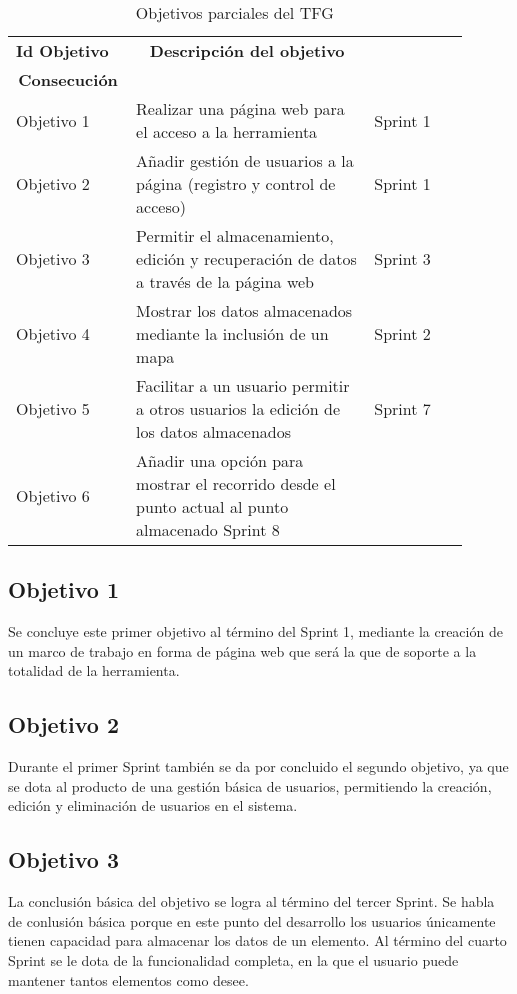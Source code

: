 \begin{table}[hp]
  \centering 
  \begin{tabular}{p{0.2\linewidth}p{0.5\linewidth}p{0.2\linewidth}}
    \multicolumn{1}{l}{\cellcolor{black!30}\textbf{Id Objetivo}} & 
 	\multicolumn{1}{c}{\cellcolor{black!30}\textbf{Descripción del objetivo}}\\
 	\multicolumn{1}{c}{\cellcolor{black!30}\textbf{Consecución}}\\
    \toprule
    Objetivo 1 & Realizar una página web para el acceso a la herramienta & Sprint 1 \\
	Objetivo 2 & Añadir gestión de usuarios a la página (registro y control de acceso) & Sprint 1 \\
	Objetivo 3 & Permitir el almacenamiento, edición y recuperación de datos a través de la página web & Sprint 3 \\
	Objetivo 4 & Mostrar los datos almacenados mediante la inclusión de un mapa & Sprint 2 \\
	Objetivo 5 & Facilitar a un usuario permitir a otros usuarios la edición de los datos almacenados & Sprint 7\\
	Objetivo 6 & Añadir una opción para mostrar el recorrido desde el punto actual al punto almacenado Sprint 8\\
    \hline
  \end{tabular}
  \caption{Objetivos parciales del \ac{TFG}}
  \label{tab:objetivos2}
\end{table}

\subsection{Objetivo 1}
Se concluye este primer objetivo al término del Sprint 1, mediante la creación de un marco de trabajo en forma de página web que será la que de soporte a la totalidad de la herramienta.

\subsection{Objetivo 2}
Durante el primer Sprint también se da por concluido el segundo objetivo, ya que se dota al producto de una gestión básica de usuarios, permitiendo la creación, edición y eliminación de usuarios en el sistema.

\subsection{Objetivo 3}
La conclusión básica del objetivo se logra al término del tercer Sprint. Se habla de conlusión básica porque en este punto del desarrollo los usuarios únicamente tienen capacidad para almacenar los datos de un elemento. Al término del cuarto Sprint se le dota de la funcionalidad completa, en la que el usuario puede mantener tantos elementos como desee.

